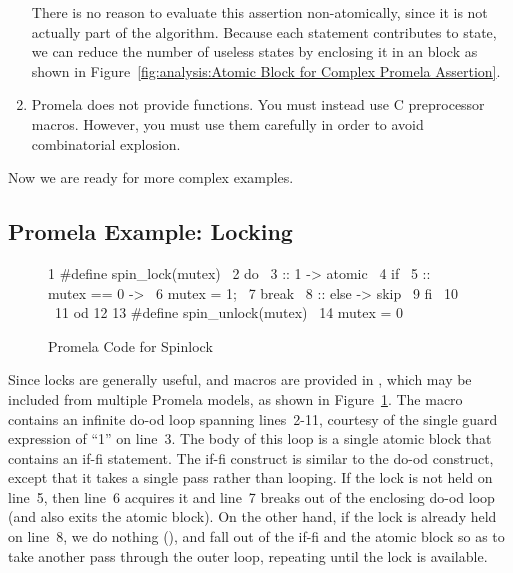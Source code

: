 \begin{enumerate}
	There is no reason to evaluate this assertion
	non-atomically, since it is not actually part of the algorithm.
	Because each statement contributes to state, we can reduce
	the number of useless states by enclosing it in an 
	block as shown in
	Figure~\ref{fig:analysis:Atomic Block for Complex Promela Assertion}.

\item	Promela does not provide functions.
	You must instead use C preprocessor macros.
	However, you must use them carefully in order to avoid
	combinatorial explosion.
\end{enumerate}

Now we are ready for more complex examples.

\subsection{Promela Example: Locking}
\label{sec:formal:Promela Example: Locking}

\begin{figure}[tbp]
{ \scriptsize
\begin{verbbox}
  1 #define spin_lock(mutex) \
  2   do \
  3   :: 1 -> atomic { \
  4       if \
  5       :: mutex == 0 -> \
  6         mutex = 1; \
  7         break \
  8       :: else -> skip \
  9       fi \
 10     } \
 11   od
 12
 13 #define spin_unlock(mutex) \
 14   mutex = 0
\end{verbbox}
}
\centering
\theverbbox
\caption{Promela Code for Spinlock}
\label{fig:analysis:Promela Code for Spinlock}
\end{figure}

Since locks are generally useful,  and
\co{spin_unlock()}
macros are provided in , which may be included from
multiple Promela models, as shown in
Figure~\ref{fig:analysis:Promela Code for Spinlock}.
The  macro contains an infinite do-od loop
spanning lines~2-11,
courtesy of the single guard expression of ``1'' on line~3.
The body of this loop is a single atomic block that contains
an if-fi statement.
The if-fi construct is similar to the do-od construct, except
that it takes a single pass rather than looping.
If the lock is not held on line~5, then line~6 acquires it and
line~7 breaks out of the enclosing do-od loop (and also exits
the atomic block).
On the other hand, if the lock is already held on line~8,
we do nothing (\co{skip}), and fall out of the if-fi and the
atomic block so as to take another pass through the outer
loop, repeating until the lock is available.

